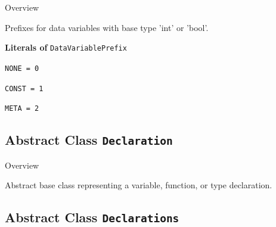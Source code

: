 	\begin{longdescription}
		\item[Overview] 		
				

	

		Prefixes for data variables with base type 'int' or 'bool'.		
	
		\item[\textbf{Literals of} \texttt{DataVariablePrefix}] ~
		\begin{longdescription}
			
\item[\texttt{NONE = 0}] ~
\nopagebreak

\item[\texttt{CONST = 1}] ~
\nopagebreak

\item[\texttt{META = 2}] ~
\nopagebreak
		\end{longdescription}
	\end{longdescription}
	
	

\subsection{Abstract Class \bfseries \texttt{Declaration}\normalfont}
\label{cls:uppaal::declarations::Declaration} 
	
	\begin{longdescription}
		\item[Overview] 		
				

	

		Abstract base class representing a variable, function, or type declaration.		
		
	
	
	\end{longdescription}
	

\subsection{Abstract Class \bfseries \texttt{Declarations}\normalfont}
\label{cls:uppaal::declarations::Declarations} 
	
